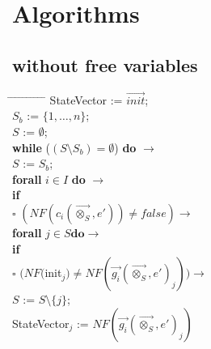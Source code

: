 \index{}\documentclass[a4paper,10pt]{article}
\theoremstyle{plain}
\theoremstyle{definition}
\newcommand{\ovr}{\overrightarrow}
\newcommand{\tb}{\textbf}
\newcommand{\ra}{$\rightarrow$}
\newcommand{\sq}{$\square$}
\begin{document}


\newpage
\section{Algorithms}
\subsection{without free variables} \label{sec:alg}
\begin{tabbing} 
\hspace*{5.mm} \= \hspace*{5.mm} \= \hspace*{5.mm} \= \hspace*{5.mm} \= \hspace*{5.mm} \= \hspace*{5.mm}  \= \hspace*{5.mm}  \= \hspace*{5.mm}  \= \hspace*{5.mm} \= \hspace*{5.mm} \= \hspace*{5.mm}\kill
StateVector := $\ovr{init}$; \\
$S_b$ := $\lbrace 1, \ldots, n \rbrace$; \\
$S$ := $\emptyset$;\\ 
\tb{while}  ($ (S \setminus S_b) = \emptyset $) \tb{do} \ra \\
  \> $S$ := $S_b$; \\
  \> \tb{forall} $i \in I$ \tb{do} \ra \\
  \>	\>	\tb{if} \\
  \>	\>	\sq \> $(NF(c_i(\ovr{\otimes_S},e')) \not= false) \rightarrow$ \\
  \>	\>	\>  	\>  \tb{forall} $j \in S \tb{do} \rightarrow$ \\
  \>	\>	\>  	\>	\>  	    \tb{if} \\
  \>	\>	\>  	\>   	\>         $\square$  \> $(NF($init$_j) \neq NF(\ovr{g_i}(\ovr{\otimes_S}, e')_j)) \rightarrow$ \\
  \>	\>	\>  	\>    	\>       \>    \>       $S$ := $S\setminus \lbrace j \rbrace$;\\
  \> 	\>	\>	\>	\>	\>	\>	StateVector$_j$ := $NF(\ovr{g_i}(\ovr{\otimes_S}, e')_j)$\\

\end{tabbing}
\end{document}
